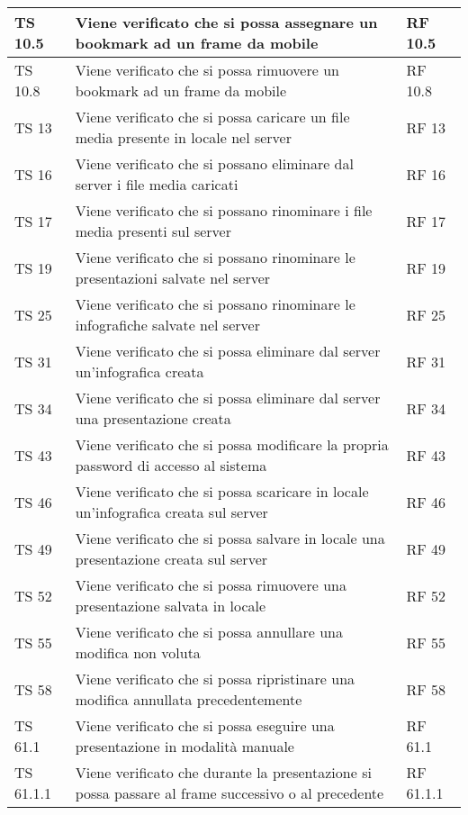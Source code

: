 {{\begin{longtable} [c]{| p{3cm} | p{6cm} |p{3cm}|}
			\hline
			TS 10.5 & Viene verificato che si possa assegnare un bookmark\ped{g} ad un frame\ped{g} da mobile & RF 10.5\\
			\hline
			TS 10.8 & Viene verificato che si possa rimuovere un bookmark\ped{g} ad un frame\ped{g} da mobile & RF 10.8\\
			\hline
			TS 13 & Viene verificato che si possa caricare un file media presente in locale nel server & RF 13\\
			\hline
			TS 16 & Viene verificato che si possano eliminare dal server\ped{g} i file media caricati & RF 16\\
			\hline
			TS 17 & Viene verificato che si possano rinominare i file media presenti sul server & RF 17\\
			\hline
			TS 19 & Viene verificato che si possano rinominare le presentazioni salvate nel server & RF 19\\
			\hline
			TS 25 & Viene verificato che si possano rinominare le infografiche salvate nel server & RF 25\\
			\hline
			TS 31 & Viene verificato che si possa eliminare dal server un'infografica creata & RF 31\\
			\hline
			TS 34 & Viene verificato che si possa eliminare dal server\ped{g} una presentazione creata & RF 34\\
			\hline
			TS 43 & Viene verificato che si possa modificare la propria password di accesso al sistema & RF 43\\
			\hline
			TS 46 & Viene verificato che si possa scaricare in locale un'infografica\ped{g} creata sul server\ped{g} & RF 46\\
			\hline
			TS 49 & Viene verificato che si possa salvare in locale una presentazione creata sul server\ped{g} & RF 49\\
			\hline
			TS 52 & Viene verificato che si possa rimuovere una presentazione salvata in locale & RF 52\\
			\hline
			TS 55 & Viene verificato che si possa annullare una modifica non voluta & RF 55\\
			\hline
			TS 58 & Viene verificato che si possa ripristinare una modifica annullata precedentemente  & RF 58\\
			\hline
			TS 61.1 & Viene verificato che si possa eseguire una presentazione in modalità manuale & RF 61.1\\
			\hline
			TS 61.1.1 & Viene verificato che durante la presentazione si possa passare al frame\ped{g} successivo o al precedente & RF 61.1.1\\

\end{longtable}}}
